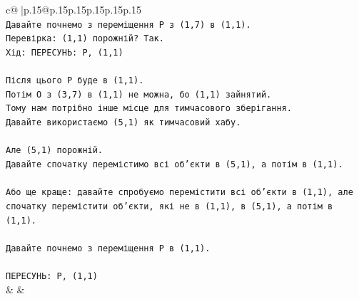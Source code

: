\documentclass{article}
\begin{document}
{\begin{supertabular}{c@{$\;$}|p{.15\linewidth}@{}p{.15\linewidth}p{.15\linewidth}p{.15\linewidth}p{.15\linewidth}p{.15\linewidth}}
{{{\\ 
\texttt{Давайте почнемо з переміщення P з (1,7) в (1,1).} \\
\texttt{Перевірка: (1,1) порожній? Так.} \\
\texttt{Хід: ПЕРЕСУНЬ: P, (1,1)} \\
\\ 
\texttt{Після цього P буде в (1,1).} \\
\texttt{Потім O з (3,7) в (1,1) не можна, бо (1,1) зайнятий.} \\
\texttt{Тому нам потрібно інше місце для тимчасового зберігання.} \\
\texttt{Давайте використаємо (5,1) як тимчасовий хабу.} \\
\\ 
\texttt{Але (5,1) порожній.} \\
\texttt{Давайте спочатку перемістимо всі об'єкти в (5,1), а потім в (1,1).} \\
\\ 
\texttt{Або ще краще: давайте спробуємо перемістити всі об'єкти в (1,1), але спочатку перемістити об'єкти, які не в (1,1), в (5,1), а потім в (1,1).} \\
\\ 
\texttt{Давайте почнемо з переміщення P в (1,1).} \\
\\ 
\texttt{ПЕРЕСУНЬ: P, (1,1)} \\
            }
        }
    }
    & & \\ \\


\end{supertabular}}
\end{document}
